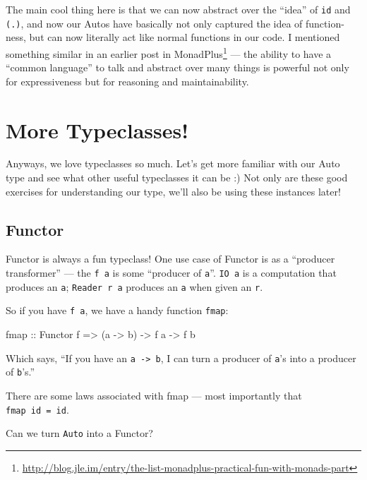 \documentclass[]{article}
\newenvironment{Shaded}{}{}
\newcommand{\DataTypeTok}[1]{\textcolor[rgb]{0.56,0.13,0.00}{{#1}}}
\newcommand{\OtherTok}[1]{\textcolor[rgb]{0.00,0.44,0.13}{{#1}}}
\newcommand{\NormalTok}[1]{{#1}}
\renewcommand{\href}[2]{#2\footnote{\url{#1}}}
\begin{document}
The main cool thing here is that we can now abstract over the ``idea''
of \texttt{id} and \texttt{(.)}, and now our Autos have basically not
only captured the idea of function-ness, but can now literally act like
normal functions in our code. I mentioned something similar in an
earlier post
\href{http://blog.jle.im/entry/the-list-monadplus-practical-fun-with-monads-part}{in
MonadPlus} --- the ability to have a ``common language'' to talk and
abstract over many things is powerful not only for expressiveness but
for reasoning and maintainability.

\section{More Typeclasses!}\label{more-typeclasses}

Anyways, we love typeclasses so much. Let's get more familiar with our
Auto type and see what other useful typeclasses it can be :) Not only
are these good exercises for understanding our type, we'll also be using
these instances later!

\subsection{Functor}\label{functor}

Functor is always a fun typeclass! One use case of Functor is as a
``producer transformer'' --- the \texttt{f\ a} is some ``producer of
\texttt{a}''. \texttt{IO\ a} is a computation that produces an
\texttt{a}; \texttt{Reader\ r\ a} produces an \texttt{a} when given an
\texttt{r}.

So if you have \texttt{f\ a}, we have a handy function \texttt{fmap}:

\begin{Shaded}
\begin{Highlighting}[]
\NormalTok{fmap}\OtherTok{ ::} \DataTypeTok{Functor} \NormalTok{f }\OtherTok{=>} \NormalTok{(a }\OtherTok{->} \NormalTok{b) }\OtherTok{->} \NormalTok{f a }\OtherTok{->} \NormalTok{f b}
\end{Highlighting}
\end{Shaded}

Which says, ``If you have an \texttt{a\ -\textgreater{}\ b}, I can turn
a producer of \texttt{a}'s into a producer of \texttt{b}'s.''

There are some laws associated with fmap --- most importantly that
\texttt{fmap\ id\ =\ id}.

Can we turn \texttt{Auto} into a Functor?
\end{document}
